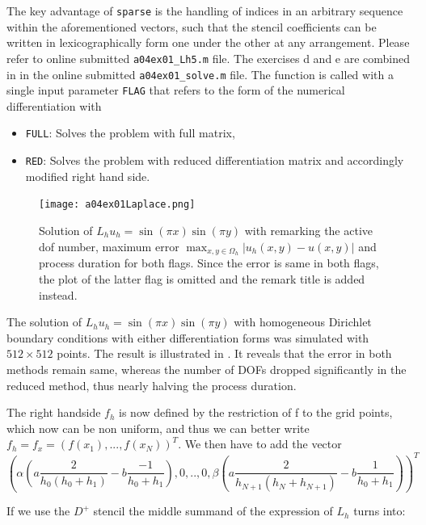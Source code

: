 The key advantage of \texttt{sparse} is the handling of indices in an arbitrary sequence within the aforementioned vectors, such that the stencil coefficients can be written in lexicographically form one under the other at any arrangement.
%
Please refer to online submitted \texttt{a04ex01\_Lh5.m} file.
%
The exercises d and e are combined in in the online submitted \texttt{a04ex01\_solve.m} file.
The function is called with a single input parameter \texttt{FLAG} that refers to the form of the numerical differentiation with
\begin{itemize}
	\item \texttt{FULL}: Solves the problem with full matrix,
	\item \texttt{RED}: Solves the problem with reduced differentiation matrix and accordingly modified right hand side.
\end{itemize}
\begin{figure}[H]
	\texttt{[image: a04ex01Laplace.png]} 
	\caption{Solution of $L_h u_h = \sin{(\pi x)} \sin{(\pi y)}$ with remarking the active dof number, maximum error $\max_{x,y \in \Omega_h} |u_h (x,y) - u(x,y)|$ and process duration for both flags. Since the error is same in both flags, the plot of the latter flag is omitted and the remark title is added instead.}
	\label{fig:a04ex01Laplace}
\end{figure}

The solution of $L_h u_h = \sin{(\pi x)} \sin{(\pi y)} $ with homogeneous Dirichlet boundary conditions with either differentiation forms was simulated with $512 \times 512$ points.
The result is illustrated in .
It reveals that the error in both methods remain same, whereas the number of DOFs dropped significantly in the reduced method, thus nearly halving the process duration.
%
%

The right handside $f_h$ is now defined by the restriction of f to the grid points, which now can be  non uniform, and thus we can better write $f_h=f_{x}=(f(x_1),...,f(x_N))^T$. We then have to add the vector
$$
(\alpha(a\frac{2}{h_0(h_0+h_{1})}-b\frac{-1}{h_0+h_1}),0,..,0,\beta(a\frac{2}{h_{N+1}(h_N+h_{N+1})}-b\frac{1}{h_0+h_1}))^T
$$

If we use the $D^+$ stencil the middle summand of the expression of $L_h$ turns into:

